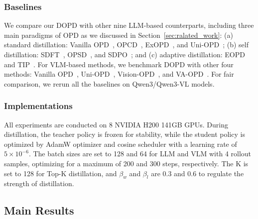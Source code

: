 \documentclass{llmxive}
\begin{document}
\subsubsection{Baselines} We compare our DOPD with other nine LLM-based counterparts, including three main paradigms of OPD as we discussed in Section~\ref{sec:ralated_work}: (a) standard distillation: Vanilla OPD~\citep{thinking2025opd}, OPCD~\citep{ye2026policy}, ExOPD~\citep{yang2026learning}, and Uni-OPD~\citep{hou2026uni}; (b) self distillation: SDFT~\citep{shenfeld2026self}, OPSD~\citep{zhao2026self}, and SDPO~\citep{hubotter2026reinforcement}; and (c) adaptive distillation: EOPD~\citep{jin2026entropy} and TIP~\citep{xu2026tip}.
For VLM-based methods, we benchmark DOPD with other four methods: Vanilla OPD~\citep{thinking2025opd}, Uni-OPD~\citep{hou2026uni}, Vision-OPD~\citep{yuan2026vision}, and VA-OPD~\citep{liu2026visual}. For fair comparison, we rerun all the baselines on Qwen3/Qwen3-VL models.



\subsubsection{Implementations} All experiments are conducted on 8 NVIDIA H200 141GB GPUs. During distillation, the teacher policy is frozen for stability, while the student policy is optimized by AdamW optimizer and cosine scheduler with a learning rate of $5\times10^{-6}$. The batch sizes are set to 128 and 64 for LLM and VLM with 4 rollout samples, optimizing for a maximum of 200 and 300 steps, respectively.
The K is set to 128 for Top-K distillation, and $\beta_{w}$ and $\beta_{l}$ are 0.3 and 0.6 to regulate the strength of distillation. 



\subsection{Main Results}
\end{document}
